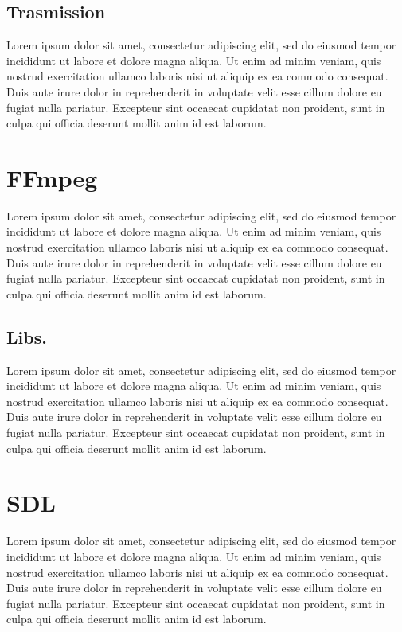 \subsection{Trasmission}
Lorem ipsum dolor sit amet, consectetur adipiscing elit, sed do eiusmod tempor incididunt ut labore et dolore magna aliqua. Ut enim ad minim veniam, quis nostrud exercitation ullamco laboris nisi ut aliquip ex ea commodo consequat. Duis aute irure dolor in reprehenderit in voluptate velit esse cillum dolore eu fugiat nulla pariatur. Excepteur sint occaecat cupidatat non proident, sunt in culpa qui officia deserunt mollit anim id est laborum.



\section{FFmpeg}
Lorem ipsum dolor sit amet, consectetur adipiscing elit, sed do eiusmod tempor incididunt ut labore et dolore magna aliqua. Ut enim ad minim veniam, quis nostrud exercitation ullamco laboris nisi ut aliquip ex ea commodo consequat. Duis aute irure dolor in reprehenderit in voluptate velit esse cillum dolore eu fugiat nulla pariatur. Excepteur sint occaecat cupidatat non proident, sunt in culpa qui officia deserunt mollit anim id est laborum\cite{FFmpeg_Documentation}.

\subsection{Libs.}
Lorem ipsum dolor sit amet, consectetur adipiscing elit, sed do eiusmod tempor incididunt ut labore et dolore magna aliqua. Ut enim ad minim veniam, quis nostrud exercitation ullamco laboris nisi ut aliquip ex ea commodo consequat. Duis aute irure dolor in reprehenderit in voluptate velit esse cillum dolore eu fugiat nulla pariatur. Excepteur sint occaecat cupidatat non proident, sunt in culpa qui officia deserunt mollit anim id est laborum.



\section{SDL}
Lorem ipsum dolor sit amet, consectetur adipiscing elit, sed do eiusmod tempor incididunt ut labore et dolore magna aliqua. Ut enim ad minim veniam, quis nostrud exercitation ullamco laboris nisi ut aliquip ex ea commodo consequat. Duis aute irure dolor in reprehenderit in voluptate velit esse cillum dolore eu fugiat nulla pariatur. Excepteur sint occaecat cupidatat non proident, sunt in culpa qui officia deserunt mollit anim id est laborum\cite{SDL_Wiki}.

